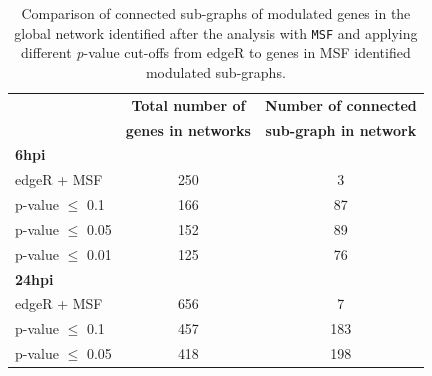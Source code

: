 \documentclass[10pt,a4paper,twocolumn]{article}
\begin{document}
	\begin{table}[]
		\centering
		\caption{Comparison of connected sub-graphs of
                  modulated genes in the global network identified
                  after the analysis with \texttt{MSF} and applying
                  different \textit{p}-value cut-offs from edgeR to
                  genes in MSF identified modulated sub-graphs. }
		\label{tab:rawVsHartung}
		\begin{tabular}{lll}
			\hline
			\multicolumn{1}{|l|}{}                            & \multicolumn{1}{c|}{\textbf{Total number of}}       & \multicolumn{1}{c|}{\textbf{Number of connected}}      \\
			\multicolumn{1}{|l|}{}                            & \multicolumn{1}{c|}{\textbf{genes in networks}}      & \multicolumn{1}{c|}{\textbf{sub-graph in network}}     \\ \hline
			\multicolumn{1}{|l|}{\textbf{6hpi}}               & \multicolumn{1}{l|}{}                                                & \multicolumn{1}{c|}{}                 \\ \hline
			\multicolumn{1}{|l|}{edgeR + MSF}                 & \multicolumn{1}{c|}{250}                                             & \multicolumn{1}{c|}{3}                \\ \hline
			\multicolumn{1}{|l|}{p-value $\leq$ 0.1}  & \multicolumn{1}{c|}{166}                                             & \multicolumn{1}{c|}{87}               \\ \hline
			\multicolumn{1}{|l|}{p-value $\leq$ 0.05} & \multicolumn{1}{c|}{152}                                             & \multicolumn{1}{c|}{89}               \\ \hline
			\multicolumn{1}{|l|}{p-value $\leq$ 0.01} & \multicolumn{1}{c|}{125}                                             & \multicolumn{1}{c|}{76}               \\ \hline
			\multicolumn{1}{|l|}{\textbf{24hpi}}              & \multicolumn{1}{c|}{}                                                & \multicolumn{1}{c|}{}                 \\ \hline
			\multicolumn{1}{|l|}{edgeR + MSF}                 & \multicolumn{1}{c|}{656}                                             & \multicolumn{1}{c|}{7}                \\ \hline
			\multicolumn{1}{|l|}{p-value $\leq$ 0.1}  & \multicolumn{1}{c|}{457}                                             & \multicolumn{1}{c|}{183}               \\ \hline
			\multicolumn{1}{|l|}{p-value $\leq$ 0.05} & \multicolumn{1}{c|}{418}                                             & \multicolumn{1}{c|}{198}              \\ \hline

\end{tabular}
\end{table}
\end{document}
